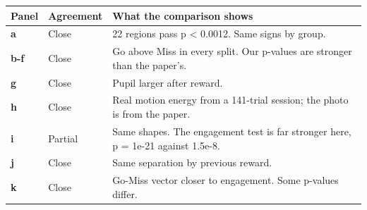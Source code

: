 \begin{longtable}{@{}p{1.1cm}p{2.5cm}p{11.8cm}@{}}
\toprule
Panel & Agreement & What the comparison shows \\
\midrule
\endhead
\textbf{a} & Close & 22 regions pass p < 0.0012. Same signs by group. \\
\textbf{b-f} & Close & Go above Miss in every split. Our p-values are stronger than the paper's. \\
\textbf{g} & Close & Pupil larger after reward. \\
\textbf{h} & Close & Real motion energy from a 141-trial session; the photo is from the paper. \\
\textbf{i} & Partial & Same shapes. The engagement test is far stronger here, p = 1e-21 against 1.5e-8. \\
\textbf{j} & Close & Same separation by previous reward. \\
\textbf{k} & Close & Go-Miss vector closer to engagement. Some p-values differ. \\
\bottomrule
\end{longtable}
